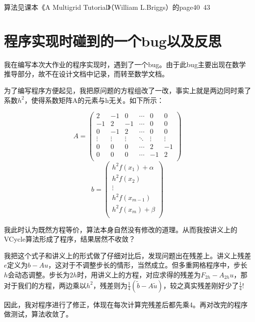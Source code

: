 \documentclass[UTF8]{ctexart}
\theoremstyle{plain}
\theoremstyle{definition}
\theoremstyle{remark}
\begin{document}
算法见课本《A Multigrid Tutorial》（William L.Briggs）的page40~43
\section{程序实现时碰到的一个bug以及反思}

我在编写本次大作业的程序实现时，遇到了一个bug。由于此bug主要出现在数学推导部分，故不在设计文档中记录，而转至数学文档。

为了编写程序方便起见，我把原问题的方程组改了一改，事实上就是两边同时乘了系数$h^2$，使得系数矩阵A的元素与h无关。如下所示：

$$
A=\begin{pmatrix}
2&-1&0&\cdots&0&0\\
-1&2&-1&\cdots&0&0\\
0&-1&2&\cdots&0&0\\
\vdots&\vdots&\vdots&\ddots&\vdots&\vdots\\
0&0&0&\cdots&2&-1\\
0&0&0&\cdots&-1&2\\
\end{pmatrix}
$$
$$
b=\begin{pmatrix}
h^{2}f(x_{1})+\alpha\\
h^{2}f(x_{2})\\
\vdots\\
h^{2}f(x_{m-1})\\
h^{2}f(x_{m})+\beta\\
\end{pmatrix}
$$

我此时认为既然方程等价，算法本身自然没有修改的道理。从而我按讲义上的VCycle算法形成了程序，结果居然不收敛？

我把这个式子和讲义上的形式做了仔细对比后，发现问题出在残差上。讲义上残差$e$定义为$b-Au$，这对于不调整步长的情形，当然成立。但多重网格程序中，步长$h$会动态调整。步长为$2h$时，用讲义上的方程，对应求得的残差为$F_{2h}-A_{2h}u$，那对于我们的方程，两边乘以$h^2$，残差则为$\frac{1}{4}(\tilde{b}-A\tilde{u})$，较之真实残差刚好少了$\frac{1}{4}$!

因此，我对程序进行了修正，体现在每次计算完残差后都先乘4。再对改完的程序做测试，算法收敛了。
\end{document}
